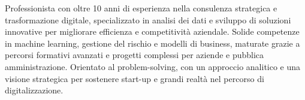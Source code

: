 Professionista con oltre 10 anni di esperienza nella consulenza strategica e trasformazione digitale, specializzato in analisi dei dati e sviluppo di soluzioni innovative per migliorare efficienza e competitività aziendale. Solide competenze in machine learning, gestione del rischio e modelli di business, maturate grazie a percorsi formativi avanzati e progetti complessi per aziende e pubblica amministrazione. Orientato al problem-solving, con un approccio analitico e una visione strategica per sostenere start-up e grandi realtà nel percorso di digitalizzazione.